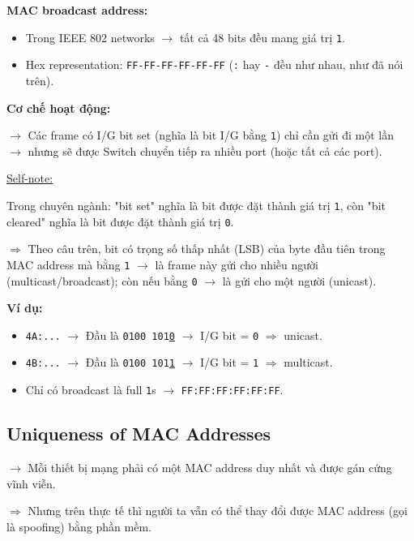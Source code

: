 \noindent
\textbf{MAC broadcast address:}

\begin{itemize}
    \item Trong IEEE 802 networks $\rightarrow$ tất cả 48 bits đều mang giá trị \texttt{1}.
    \item Hex representation: \texttt{FF-FF-FF-FF-FF-FF} (\texttt{:} hay \texttt{-} đều như nhau, như đã nói trên).
\end{itemize}
\medskip

\noindent
\textbf{Cơ chế hoạt động:}
\medskip

\noindent
$\rightarrow$ Các frame có I/G bit set (nghĩa là bit I/G bằng \texttt{1}) chỉ cần gửi đi một lần $\rightarrow$ nhưng sẽ được Switch chuyển tiếp ra nhiều port (hoặc tất cả các port).
\medskip

\noindent
\underline{Self-note:}
\medskip

\noindent
Trong chuyên ngành: "bit set" nghĩa là bit được đặt thành giá trị \texttt{1}, còn "bit cleared" nghĩa là bit được đặt thành giá trị \texttt{0}.

$\Rightarrow$ Theo câu trên, bit có trọng số thấp nhất (LSB) của byte đầu tiên trong MAC address mà bằng \texttt{1} $\rightarrow$ là frame này gửi cho nhiều người (multicast/broadcast); còn nếu bằng \texttt{0} $\rightarrow$ là gửi cho một người (unicast).
\medskip

\noindent
\textbf{Ví dụ:}

\begin{itemize}
    \item \texttt{4A:...} $\rightarrow$ Đầu là \texttt{0100 101\underline{0}} $\rightarrow$ I/G bit = \texttt{0} $\Rightarrow$ unicast.
    \item \texttt{4B:...} $\rightarrow$ Đầu là \texttt{0100 101\underline{1}} $\rightarrow$ I/G bit = \texttt{1} $\Rightarrow$ multicast.
    \item[$\Rightarrow$] Chỉ có broadcast là full \texttt{1}s $\rightarrow$ \texttt{FF:FF:FF:FF:FF:FF}.
\end{itemize}
\medskip

\subsection{Uniqueness of MAC Addresses}

\noindent
$\rightarrow$ Mỗi thiết bị mạng phải có một MAC address duy nhất và được gán cứng vĩnh viễn.

$\Rightarrow$ Nhưng trên thực tế thì người ta vẫn có thể thay đổi được MAC address (gọi là spoofing) bằng phần mềm.
\medskip

